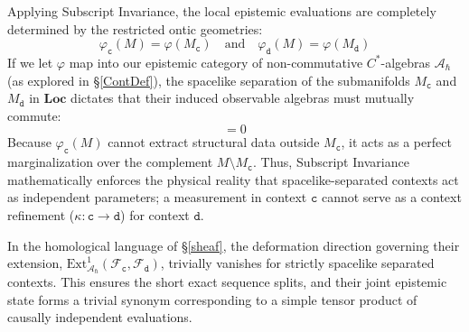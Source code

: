 \documentclass{article}
\numberwithin{tm}{section}
\numberwithin{dn}{section}
\numberwithin{as}{section}
\numberwithin{rk}{section}
\numberwithin{lem}{section}
\numberwithin{ax}{section}
\numberwithin{pp}{section}
\numberwithin{eg}{section}
\numberwithin{war}{section}
\numberwithin{equation}{section}
\numberwithin{prop}{section}
\numberwithin{nt}{section}
\numberwithin{rc}{section}
\def\code#1{\texttt{#1}}
\begin{document}
Applying Subscript Invariance, the local epistemic evaluations are completely determined by the restricted ontic geometries:
\begin{equation}
	\varphi_{\code{c}}(M) = \varphi(M_{\code{c}}) \quad \text{and} \quad \varphi_{\code{d}}(M) = \varphi(M_{\code{d}})
\end{equation}
If we let $\varphi$ map into our epistemic category of non-commutative $C^*$-algebras $\mathcal{A}_\hbar$ (as explored in \S\ref{ContDef}), the spacelike separation of the submanifolds $M_{\code{c}}$ and $M_{\code{d}}$ in $\mathbf{Loc}$ dictates that their induced observable algebras must mutually commute:
\begin{equation}
	[\varphi(M_{\code{c}}), \varphi(M_{\code{d}})] = 0
\end{equation}
Because $\varphi_{\code{c}}(M)$ cannot extract structural data outside $M_{\code{c}}$, it acts as a perfect marginalization over the complement $M \setminus M_{\code{c}}$. Thus, Subscript Invariance mathematically enforces the physical reality that spacelike-separated contexts act as independent parameters; a measurement in context $\code{c}$ cannot serve as a context refinement ($\kappa: \code{c} \to \code{d}$) for context $\code{d}$. 

In the homological language of \S\ref{sheaf}, the deformation direction governing their extension, $\text{Ext}^1_{\mathcal{A}_\hbar}(\mathcal{F}_{\code{c}}, \mathcal{F}_{\code{d}})$, trivially vanishes for strictly spacelike separated contexts. This ensures the short exact sequence splits, and their joint epistemic state forms a trivial synonym corresponding to a simple tensor product of causally independent evaluations.

\pagebreak

\appendix
\end{document}

